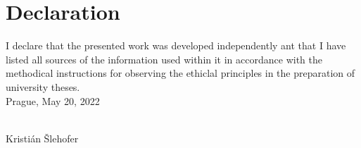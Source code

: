 \null\vfill{}
\section*{Declaration}
I declare that the presented work was developed independently ant that I have listed all sources of the information used within it in accordance with the methodical instructions for observing the ethiclal principles in the preparation of university theses.\\[0.5cm]

Prague, May 20, 2022	
\bigskip
\bigskip
\bigskip 

\begin{flushright}  

 \begin{minipage}{0.35\textwidth} 
  \centering   
  \dotfill\\   
  Kristián Šlehofer
 \end{minipage}
\end{flushright}